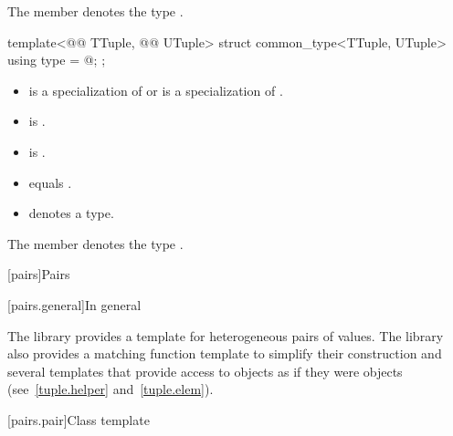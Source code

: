 \documentclass{wg21}
\begin{document}
\begin{addedblock}
\begin{itemdescr}
The member   denotes the type .

\end{itemdescr}

\begin{itemdecl}
template<@@ TTuple, @@ UTuple>
struct common_type<TTuple, UTuple> {
    using type = @\seebelow@;
};
\end{itemdecl}
\begin{itemdescr}

\constraints
\begin{itemize}
    \item {} is a specialization of  or  is a specialization of .
    \item {} is .
    \item {} is .
    \item {} equals .
    \item {} denotes a type.

\end{itemize}

The member   denotes the type .

\end{itemdescr}
\end{addedblock}


[pairs]{Pairs}

[pairs.general]{In general}

\pnum
The library provides a template for heterogeneous pairs of values.
The library also provides a matching function template to simplify
their construction and several templates that provide access to 
objects as if they were  objects (see~\ref{tuple.helper}
and~\ref{tuple.elem}).%
%
%
%

[pairs.pair]{Class template }
\end{document}
